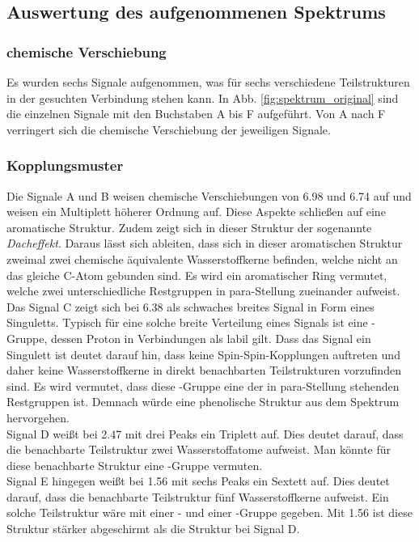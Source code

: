 \newpage

\subsection{Auswertung des aufgenommenen Spektrums}
\subsubsection*{chemische Verschiebung}
Es wurden sechs Signale aufgenommen, was für sechs verschiedene Teilstrukturen in der gesuchten Verbindung stehen kann. In Abb. \ref{fig:spektrum_original} sind die einzelnen Signale mit den Buchstaben A bis F aufgeführt. 
Von A nach F verringert sich die chemische Verschiebung der jeweiligen Signale.
\vspace*{-2mm}
\subsubsection*{Kopplungsmuster}
Die Signale A und B weisen chemische Verschiebungen von \SI{6,98}{\ppm} und \SI{6,74}{\ppm} auf und weisen ein Multiplett höherer Ordnung auf. Diese Aspekte schließen auf eine aromatische Struktur. Zudem zeigt sich in dieser Struktur der sogenannte \textit{Dacheffekt}. Daraus lässt sich ableiten, dass sich in dieser aromatischen Struktur zweimal zwei chemische äquivalente Wasserstoffkerne befinden, welche nicht an das gleiche C-Atom gebunden sind. Es wird ein aromatischer Ring vermutet, welche zwei unterschiedliche Restgruppen in para-Stellung zueinander aufweist.\\
Das Signal C zeigt sich bei \SI{6,38}{\ppm} als schwaches breites Signal in Form eines Singuletts. Typisch für eine solche breite Verteilung eines Signals ist eine -Gruppe, dessen Proton in Verbindungen als labil gilt. Dass das Signal ein Singulett ist deutet darauf hin, dass keine Spin-Spin-Kopplungen auftreten und daher keine Wasserstoffkerne in direkt benachbarten Teilstrukturen vorzufinden sind. Es wird vermutet, dass diese -Gruppe eine der in para-Stellung stehenden Restgruppen ist. Demnach würde eine phenolische Struktur aus dem Spektrum hervorgehen.\\
Signal D weißt bei \SI{2,47}{\ppm} mit drei Peaks ein Triplett auf. Dies deutet darauf, dass die benachbarte Teilstruktur zwei Wasserstoffatome aufweist. Man könnte für diese benachbarte Struktur eine -Gruppe vermuten.\\
Signal E hingegen weißt bei \SI{1,56}{\ppm} mit sechs Peaks ein Sextett auf. Dies deutet darauf, dass die benachbarte Teilstruktur fünf Wasserstoffkerne aufweist. Ein solche Teilstruktur wäre mit einer - und einer -Gruppe gegeben. Mit \SI{1,56}{\ppm} ist diese Struktur stärker abgeschirmt als die Struktur bei Signal D. \\
